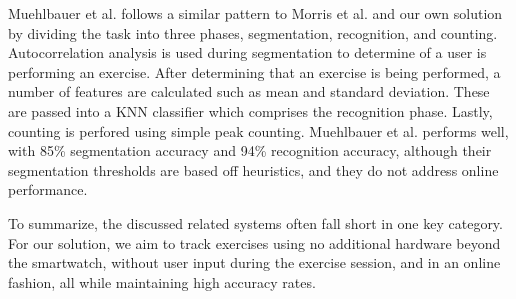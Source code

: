 Muehlbauer et al. follows a similar pattern to Morris et al. and our own solution by dividing the task into three phases, segmentation, recognition, and counting. Autocorrelation analysis is used during segmentation to determine of a user is performing an exercise. After determining that an exercise is being performed, a number of features are calculated such as mean and standard deviation. These are passed into a KNN classifier which comprises the recognition phase. Lastly, counting is perfored using simple peak counting. Muehlbauer et al. performs well, with 85\% segmentation accuracy and 94\% recognition accuracy, although their segmentation thresholds are based off heuristics, and they do not address online performance. 

To summarize, the discussed related systems often fall short in one key category. For our solution, we aim to track exercises using no additional hardware beyond the smartwatch, without user input during the exercise session, and in an online fashion, all while maintaining high accuracy rates. 